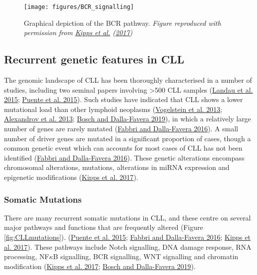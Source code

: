 \documentclass[11pt, a4paper, twosided]{book}
\begin{document}
\begin{figure}

{\centering \texttt{[image: figures/BCR\_signalling]} 

}

\caption{Graphical depiction of the BCR pathway. \emph{Figure reproduced with permission from \protect\hyperlink{ref-Kipps2017}{Kipps et al.} (\protect\hyperlink{ref-Kipps2017}{2017}) }}\label{fig:BCRsignalling}
\end{figure}
\hypertarget{intro-genetic-features}{%
\subsection{Recurrent genetic features in CLL}\label{intro-genetic-features}}

The genomic landscape of CLL has been thoroughly characterised in a number of studies, including two seminal papers involving \textgreater500 CLL samples (\protect\hyperlink{ref-Landau2015}{Landau et al. 2015}; \protect\hyperlink{ref-Puente2015}{Puente et al. 2015}). Such studies have indicated that CLL shows a lower mutational load than other lymphoid neoplasms (\protect\hyperlink{ref-Vogelstein2013}{Vogelstein et al. 2013}; \protect\hyperlink{ref-Alexandrov2013}{Alexandrov et al. 2013}; \protect\hyperlink{ref-Bosch2019}{Bosch and Dalla-Favera 2019}), in which a relatively large number of genes are rarely mutated (\protect\hyperlink{ref-Fabbri2016}{Fabbri and Dalla-Favera 2016}). A small number of driver genes are mutated in a significant proportion of cases, though a common genetic event which can accounts for most cases of CLL has not been identified (\protect\hyperlink{ref-Fabbri2016}{Fabbri and Dalla-Favera 2016}). These genetic alterations encompass chromosomal alterations, mutations, alterations in miRNA expression and epigenetic modifications (\protect\hyperlink{ref-Kipps2017}{Kipps et al. 2017}).

\hypertarget{intro-mutations}{%
\subsubsection{Somatic Mutations}\label{intro-mutations}}

There are many recurrent somatic mutations in CLL, and these centre on several major pathways and functions that are frequently altered (Figure \ref{fig:CLLmutations}). (\protect\hyperlink{ref-Puente2015}{Puente et al. 2015}; \protect\hyperlink{ref-Fabbri2016}{Fabbri and Dalla-Favera 2016}; \protect\hyperlink{ref-Kipps2017}{Kipps et al. 2017}). These pathways include Notch signalling, DNA damage response, RNA processing, NF\(\kappa\)B signalling, BCR signalling, WNT signalling and chromatin modification (\protect\hyperlink{ref-Kipps2017}{Kipps et al. 2017}; \protect\hyperlink{ref-Bosch2019}{Bosch and Dalla-Favera 2019}).
\end{document}
